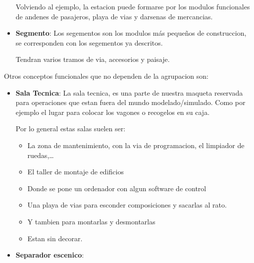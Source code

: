 \begin{itemize}
Volviendo al ejemplo, la estacion puede formarse por los modulos funcionales de andenes de pasajeros, playa de vias y darsenas de mercancias.

\item \textbf{Segmento}: Los segementos son los modulos más pequeños de construccion, se corresponden con los segementos ya descritos. 

Tendran varios tramos de via, accesorios\sidenote{} y paisaje.
\end{itemize}

Otros conceptos funcionales que no dependen de la agrupacion son:

 
\begin{itemize}
\item \textbf{Sala Tecnica}: La sala tecnica, es una parte de nuestra maqueta reservada para operaciones que estan fuera del mundo modelado/simulado. Como por ejemplo el lugar para colocar los vagones o recogelos en su caja.

Por lo general estas salas suelen ser:

\begin{itemize}
\item La zona de mantenimiento, con la via de programacion, el limpiador de ruedas,\dots
\item El taller de montaje de edificios
\item Donde se pone un ordenador con algun software de control
\item Una playa de vias para esconder composiciones y sacarlas al rato. 
\item Y tambien para montarlas y desmontarlas
\item Estan sin decorar.
\end{itemize}

\item \textbf{Separador escenico}:
\end{itemize}

 
